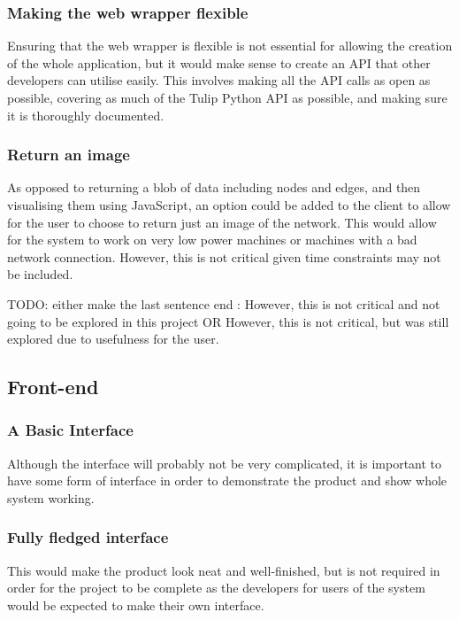 \documentclass[../dissertation.tex]{subfiles}
\begin{document}
\subsubsection{Making the web wrapper flexible}

Ensuring that the web wrapper is flexible is not essential for allowing the creation of the whole application, but it would make sense to create an API that other developers can utilise easily. This involves making all the API calls as open as possible, covering as much of the Tulip Python API as possible, and making sure it is thoroughly documented. 

\subsubsection{Return an image}

As opposed to returning a blob of data including nodes and edges, and then visualising them using JavaScript, an option could be added to the client to allow for the user to choose to return just an image of the network. This would allow for the system to work on very low power machines or machines with a bad network connection. However, this is not critical given time constraints may not be included.

TODO: either make the last sentence end : However, this is not critical and not going to be explored in this project OR However, this is not critical, but was still explored due to usefulness for the user.

\subsection{Front-end}

\subsubsection{A Basic Interface}

Although the interface will probably not be very complicated, it is important to have some form of interface in order to demonstrate the product and show whole system working. 

\subsubsection{Fully fledged interface}

This would make the product look neat and well-finished, but is not required in order for the project to be complete as the developers for users of the system would be expected to make their own interface.
\end{document}
